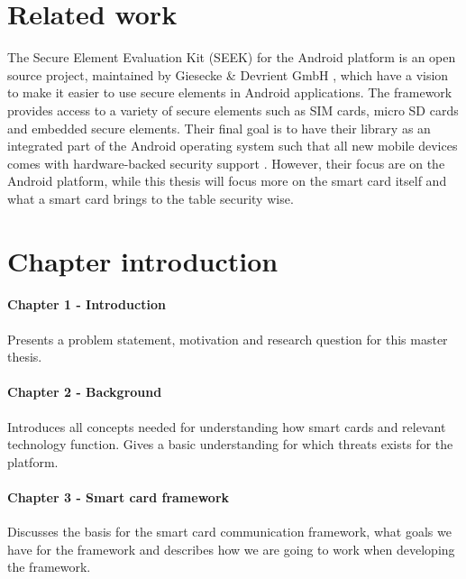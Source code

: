 
\section{Related work}
The Secure Element Evaluation Kit (SEEK) for the Android platform is an open source project, maintained by Giesecke \& Devrient GmbH \cite{Giesecke}, which have a vision to make it easier to use secure elements in Android applications. The framework provides access to a variety of secure elements such as SIM cards, micro SD cards and embedded secure elements. Their final goal is to have their library as an integrated part of the Android operating system such that all new mobile devices comes with hardware-backed security support \cite{SEEK}. However, their focus are on the Android platform, while this thesis will focus more on the smart card itself and what a smart card brings to the table security wise.

\section{Chapter introduction}
\paragraph{Chapter 1 - Introduction}
Presents a problem statement, motivation and research question for this master thesis.

\paragraph{Chapter 2 - Background}
Introduces all concepts needed for understanding how smart cards and relevant technology function. Gives a basic understanding for which threats exists for the platform.

\paragraph{Chapter 3 - Smart card framework}
Discusses the basis for the smart card communication framework, what goals we have for the framework and describes how we are going to work when developing the framework.

